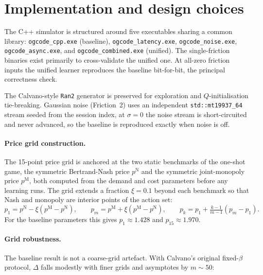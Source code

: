 \section{Implementation and design choices}
\label{app:implementation}

The C++ simulator is structured around five executables sharing a common library: \texttt{ogcode\_cpp.exe} (baseline), \texttt{ogcode\_latency.exe}, \texttt{ogcode\_noise.exe}, \texttt{ogcode\_async.exe}, and \texttt{ogcode\_combined.exe} (unified). The single-friction binaries exist primarily to cross-validate the unified one. At all-zero friction inputs the unified learner reproduces the baseline bit-for-bit, the principal correctness check.

The Calvano-style \texttt{Ran2} generator is preserved for exploration and $Q$-initialisation tie-breaking. Gaussian noise (Friction~2) uses an independent \texttt{std::mt19937\_64} stream seeded from the session index, at $\sigma=0$ the noise stream is short-circuited and never advanced, so the baseline is reproduced exactly when noise is off.

\paragraph{Price grid construction.}
\label{app:price-grid}
The 15-point price grid is anchored at the two static benchmarks of the one-shot game, the symmetric Bertrand-Nash price $p^{\mathrm{N}}$ and the symmetric joint-monopoly price $p^{\mathrm{M}}$, both computed from the demand and cost parameters before any learning runs. The grid extends a fraction $\xi=0.1$ beyond each benchmark so that Nash and monopoly are interior points of the action set:
\begin{equation}
    p_1 = p^{\mathrm{N}} - \xi(p^{\mathrm{M}} - p^{\mathrm{N}}),\qquad p_m = p^{\mathrm{M}} + \xi(p^{\mathrm{M}} - p^{\mathrm{N}}),\qquad p_k = p_1 + \tfrac{k-1}{m-1}(p_m - p_1).
    \label{eq:price-grid}
\end{equation}
For the baseline parameters this gives $p_1\approx 1.428$ and $p_{15}\approx 1.970$.

\paragraph{Grid robustness.} The baseline result is not a coarse-grid artefact. With Calvano's original fixed-$\beta$ protocol, $\Delta$ falls modestly with finer grids and asymptotes by $m\sim 50$:

